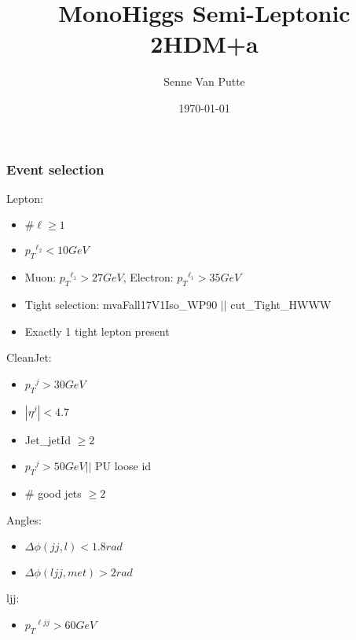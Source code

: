 \documentclass{beamer}
\title{ MonoHiggs Semi-Leptonic 2HDM+a}
\author{ Senne Van Putte }
\institute[UAntwerpen] %
{
University of Antwerp \\ %
\medskip
}
\date{\today} %
\begin{document}
\begin{frame}
\titlepage %
\end{frame}



\begin{frame}
    \frametitle{Event selection}
    Lepton:
    \begin{itemize}
        \item $\# \ell \geqslant 1$
        \item ${p_{T}}^{\ell_{2}} < 10 GeV$
        \item Muon: $ {p_{T}}^{\ell_{1}} > 27 GeV $, Electron: $ {p_{T}}^{\ell_{1}} > 35 GeV $
        \item Tight selection: mvaFall17V1Iso\_WP90 $ || $ cut\_Tight\_HWWW 
        \item Exactly 1 tight lepton present 
    \end{itemize}
    CleanJet:
    \begin{itemize}
        \item ${p_{T}}^{j} > 30 GeV$ 
        \item $|{\eta}^{j}| < 4.7 $
        \item Jet\_jetId $\geqslant 2$
        \item ${p_{T}}^{j} > 50 GeV || $ PU loose id
        \item $\# $ good jets $ \geqslant 2$  
    \end{itemize}
    Angles:
    \begin{itemize}
        \item $\Delta\phi (jj, l) < 1.8 rad$ 
        \item $\Delta\phi (ljj, met) > 2 rad$ 
    \end{itemize}
    ljj:
    \begin{itemize}
        \item ${p_{T}}^{\ell jj} > 60 GeV $ 
    \end{itemize}
\end{frame}
\end{document}
